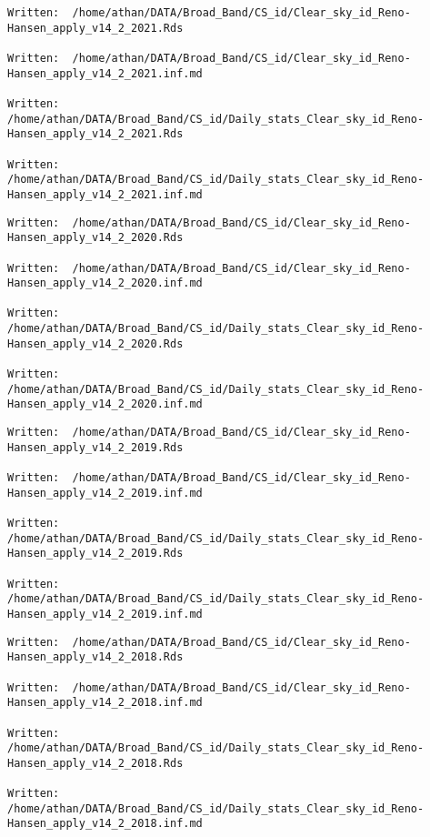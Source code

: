 \documentclass[
  10pt,
  a4paper,oneside]{article}
\begin{document}
\begin{verbatim}
Written:  /home/athan/DATA/Broad_Band/CS_id/Clear_sky_id_Reno-Hansen_apply_v14_2_2021.Rds 

Written:  /home/athan/DATA/Broad_Band/CS_id/Clear_sky_id_Reno-Hansen_apply_v14_2_2021.inf.md 

Written:  /home/athan/DATA/Broad_Band/CS_id/Daily_stats_Clear_sky_id_Reno-Hansen_apply_v14_2_2021.Rds 

Written:  /home/athan/DATA/Broad_Band/CS_id/Daily_stats_Clear_sky_id_Reno-Hansen_apply_v14_2_2021.inf.md 
\end{verbatim}

\begin{verbatim}
Written:  /home/athan/DATA/Broad_Band/CS_id/Clear_sky_id_Reno-Hansen_apply_v14_2_2020.Rds 

Written:  /home/athan/DATA/Broad_Band/CS_id/Clear_sky_id_Reno-Hansen_apply_v14_2_2020.inf.md 

Written:  /home/athan/DATA/Broad_Band/CS_id/Daily_stats_Clear_sky_id_Reno-Hansen_apply_v14_2_2020.Rds 

Written:  /home/athan/DATA/Broad_Band/CS_id/Daily_stats_Clear_sky_id_Reno-Hansen_apply_v14_2_2020.inf.md 
\end{verbatim}

\begin{verbatim}
Written:  /home/athan/DATA/Broad_Band/CS_id/Clear_sky_id_Reno-Hansen_apply_v14_2_2019.Rds 

Written:  /home/athan/DATA/Broad_Band/CS_id/Clear_sky_id_Reno-Hansen_apply_v14_2_2019.inf.md 

Written:  /home/athan/DATA/Broad_Band/CS_id/Daily_stats_Clear_sky_id_Reno-Hansen_apply_v14_2_2019.Rds 

Written:  /home/athan/DATA/Broad_Band/CS_id/Daily_stats_Clear_sky_id_Reno-Hansen_apply_v14_2_2019.inf.md 
\end{verbatim}

\begin{verbatim}
Written:  /home/athan/DATA/Broad_Band/CS_id/Clear_sky_id_Reno-Hansen_apply_v14_2_2018.Rds 

Written:  /home/athan/DATA/Broad_Band/CS_id/Clear_sky_id_Reno-Hansen_apply_v14_2_2018.inf.md 

Written:  /home/athan/DATA/Broad_Band/CS_id/Daily_stats_Clear_sky_id_Reno-Hansen_apply_v14_2_2018.Rds 

Written:  /home/athan/DATA/Broad_Band/CS_id/Daily_stats_Clear_sky_id_Reno-Hansen_apply_v14_2_2018.inf.md 
\end{verbatim}
\end{document}
